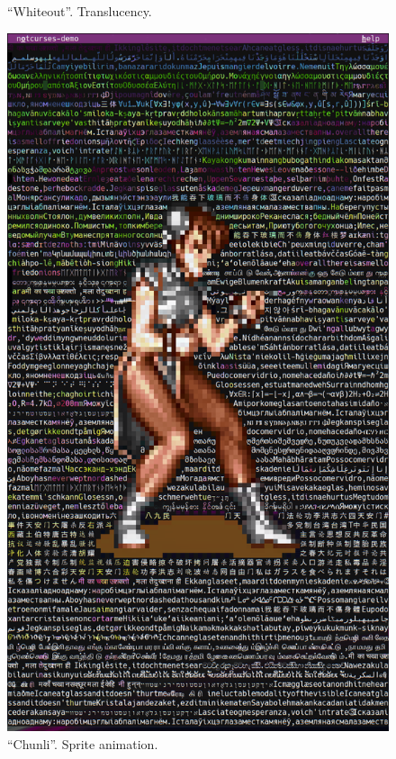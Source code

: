 \documentclass[letterpaper,10pt]{article}
\begin{document}
\begin{figure}
\begin{minipage}{0.45\textwidth}
    \caption{``Whiteout''. Translucency.}
  \end{minipage}\hfill
\end{figure}

\begin{figure}
  \centering \includegraphics[width=.65\linewidth]{media/demo-chunli1.png}
  \caption{``Chunli''. Sprite animation.}
\end{figure}
\end{document}
